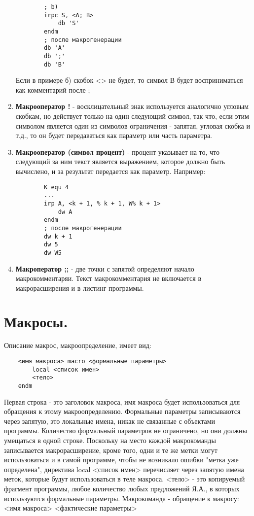 \begin{enumerate}
\begin{verbatim}
        ; b)
        irpc S, <A; B>
            db 'S'
        endm
        ; после макрогенерации
        db 'A'
        db ';'
        db 'B'
    \end{verbatim}
    Если в примере б) скобок <> не будет, то символ В будет восприниматься как комментарий после ;
    \item \textbf{Макрооператор !} - восклицательный знак используется аналогично угловым скобкам, но действует только на один следующий символ, так что, если этим символом является один из символов ограничения - запятая, угловая скобка и т.д., то он будет передаваться как параметр или часть параметра.
    \item \textbf{Макрооператор (символ процент)} - процент указывает на то, что следующий за ним текст является выражением, которое должно быть вычислено, и за результат передается как параметр. Например:
    \begin{verbatim}
        K equ 4
        ...
        irp A, <k + 1, % k + 1, W% k + 1>
            dw A
        endm
        ; после макрогенерации
        dw k + 1
        dw 5
        dw W5
    \end{verbatim}
    \item \textbf{Макроператор ;;} - две точки с запятой определяют начало макрокомментаряи. Текст макрокомментария не включается в макрорасширения и в листинг программы.
\end{enumerate}

\section{Макросы.}

Описание макрос, макроопределение, имеет вид:
\begin{verbatim}
    <имя макроса> macro <формальные параметры>
        local <список имен>
        <тело>
    endm
\end{verbatim}
Первая строка - это заголовок макроса, имя макроса будет использоваться для обращения к этому макроопределению. Формальные параметры записываются через запятую, это локальные имена, никак не связанные с объектами программы. Количество формальный параметров не ограничено, но они должны умещаться в одной строке.
Поскольку на место каждой макрокоманды записывается макрорасширение, кроме того, одни и те же метки могут использоваться и в самой программе, чтобы не возникало ошибки "метка уже определена", директива local <список имен> перечисляет через запятую имена меток, которые будут использоваться в теле макроса. <тело> - это копируемый фрагмент программы, любое количество любых предложений Я.А., в которых используются формальные параметры.
Макрокоманда - обращение к макросу:
<имя макроса> <фактические параметры>

